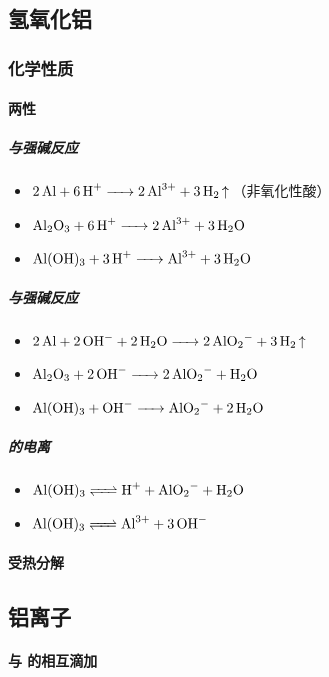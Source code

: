 \subsection{氢氧化铝}

\subsubsection{化学性质}

\paragraph{两性}

\subparagraph{与强碱反应}

\begin{itemize}
	\item $\ce{2Al + 6H+ -> 2Al^3+ + 3H2 ^}$（非氧化性酸）
	\item $\ce{Al2O3 + 6H+ -> 2Al^3+ + 3H2O}$
	\item $\ce{Al(OH)3 + 3H+ -> Al^3+ + 3H2O}$
\end{itemize}

\subparagraph{与强碱反应}

\begin{itemize}
	\item $\ce{2Al + 2OH- + 2H2O -> 2AlO2- + 3H2 ^}$
	\item $\ce{Al2O3 + 2OH- -> 2AlO2- + H2O}$
	\item $\ce{Al(OH)3 + OH- -> AlO2- + 2H2O}$
\end{itemize}

\subparagraph{ 的电离}

\begin{itemize}
	\item $\ce{Al(OH)3 <=> H+ + AlO2- + H2O}$
	\item $\ce{Al(OH)3 <=> Al^3+ + 3OH-}$
\end{itemize}

\paragraph{受热分解}


\subsection{铝离子}

\paragraph{与 的相互滴加}

